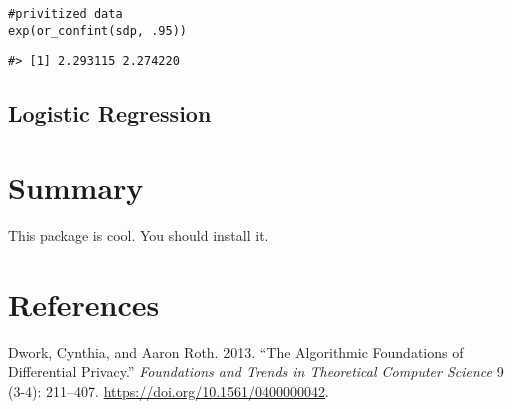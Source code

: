 \begin{verbatim}
#privitized data
exp(or_confint(sdp, .95))
\end{verbatim}

\begin{verbatim}
#> [1] 2.293115 2.274220
\end{verbatim}

\hypertarget{logistic-regression}{%
\subsection{Logistic Regression}\label{logistic-regression}}

\hypertarget{summary}{%
\section{Summary}\label{summary}}

This package is cool. You should install it.

\hypertarget{references}{%
\section*{References}\label{references}}

\hypertarget{refs}{}
\begin{CSLReferences}{1}{0}
\leavevmode{}%
Dwork, Cynthia, and Aaron Roth. 2013. {``The Algorithmic Foundations of Differential Privacy.''} \emph{Foundations and Trends{\textregistered} in Theoretical Computer Science} 9 (3-4): 211--407. \url{https://doi.org/10.1561/0400000042}.

\end{CSLReferences}



\address{%
Jordan A. Awan\\
Purdue University\\%
Department of Statistics\\ West Lafayette, IN 47907\\
%
\url{https://www.britannica.com/animal/quokka}\\%
%
\href{mailto:jawan@purdue.edu}{\nolinkurl{jawan@purdue.edu}}%
}

\address{%
Kevin Eng\\
Rutgers University\\%
Department of Statistics\\ Piscataway, NJ 08854\\
%
\url{https://www.britannica.com/animal/quokka}\\%
%
\href{mailto:ke157@stat.rutgers.edu}{\nolinkurl{ke157@stat.rutgers.edu}}%
}

